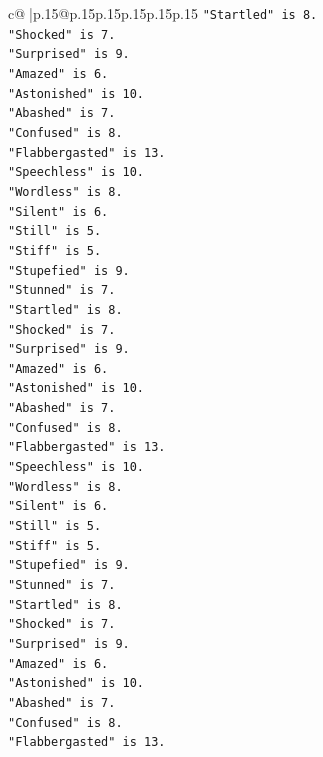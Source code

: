 \documentclass{article}
\begin{document}
{\begin{supertabular}{c@{$\;$}|p{.15\linewidth}@{}p{.15\linewidth}p{.15\linewidth}p{.15\linewidth}p{.15\linewidth}p{.15\linewidth}}
{{{\texttt{"Startled" is 8.} \\
\texttt{"Shocked" is 7.} \\
\texttt{"Surprised" is 9.} \\
\texttt{"Amazed" is 6.} \\
\texttt{"Astonished" is 10.} \\
\texttt{"Abashed" is 7.} \\
\texttt{"Confused" is 8.} \\
\texttt{"Flabbergasted" is 13.} \\
\texttt{"Speechless" is 10.} \\
\texttt{"Wordless" is 8.} \\
\texttt{"Silent" is 6.} \\
\texttt{"Still" is 5.} \\
\texttt{"Stiff" is 5.} \\
\texttt{"Stupefied" is 9.} \\
\texttt{"Stunned" is 7.} \\
\texttt{"Startled" is 8.} \\
\texttt{"Shocked" is 7.} \\
\texttt{"Surprised" is 9.} \\
\texttt{"Amazed" is 6.} \\
\texttt{"Astonished" is 10.} \\
\texttt{"Abashed" is 7.} \\
\texttt{"Confused" is 8.} \\
\texttt{"Flabbergasted" is 13.} \\
\texttt{"Speechless" is 10.} \\
\texttt{"Wordless" is 8.} \\
\texttt{"Silent" is 6.} \\
\texttt{"Still" is 5.} \\
\texttt{"Stiff" is 5.} \\
\texttt{"Stupefied" is 9.} \\
\texttt{"Stunned" is 7.} \\
\texttt{"Startled" is 8.} \\
\texttt{"Shocked" is 7.} \\
\texttt{"Surprised" is 9.} \\
\texttt{"Amazed" is 6.} \\
\texttt{"Astonished" is 10.} \\
\texttt{"Abashed" is 7.} \\
\texttt{"Confused" is 8.} \\
\texttt{"Flabbergasted" is 13.} \\
}}}
\end{supertabular}}
\end{document}
